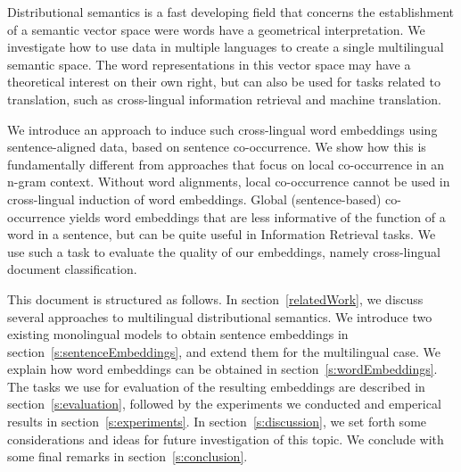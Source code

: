 









Distributional semantics is a fast developing field that concerns the establishment of a semantic vector space were words have a geometrical interpretation. We investigate how to use data in multiple languages to create a single multilingual semantic space. The word representations in this vector space may have a theoretical interest on their own right, but can also be used for tasks related to translation, such as cross-lingual information retrieval and machine translation. 

We introduce an approach to induce such cross-lingual word embeddings using sentence-aligned data, based on sentence co-occurrence. We show how this is fundamentally different from approaches that focus on local co-occurrence in an n-gram context. Without word alignments, local co-occurrence cannot be used in cross-lingual induction of word embeddings. Global (sentence-based) co-occurrence yields word embeddings that are less informative of the function of a word in a sentence, but can be quite useful in Information Retrieval tasks. We use such a task to evaluate the quality of our embeddings, namely cross-lingual document classification.

This document is structured as follows. In section~\ref{relatedWork}, we discuss several  approaches to multilingual distributional semantics. We introduce two existing monolingual models to obtain sentence embeddings in section~\ref{s:sentenceEmbeddings}, and extend them for the multilingual case. We explain how word embeddings can be obtained in section~\ref{s:wordEmbeddings}. The tasks we use for evaluation of the resulting embeddings are described in section~\ref{s:evaluation}, followed by the experiments we conducted and emperical results in section~\ref{s:experiments}. In section~\ref{s:discussion}, we set forth some considerations and ideas for future investigation of this topic. We conclude with some final remarks in section~\ref{s:conclusion}.

